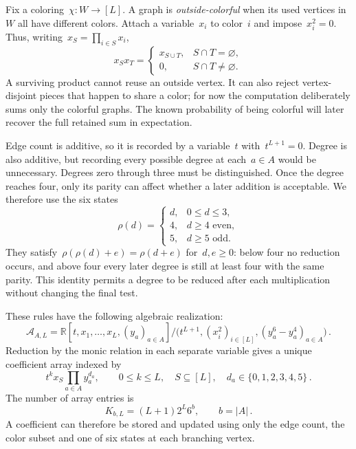 \documentclass[10pt]{article}
\theoremstyle{plain}
\theoremstyle{definition}
\theoremstyle{remark}
\begin{document}
Fix a coloring~$\chi:W\to[L]$. A graph is \emph{outside-colorful} when its used vertices in~$W$ all have different colors. Attach a variable~$x_i$ to color~$i$ and impose~$x_i^2=0$. Thus, writing~$x_S=\prod_{i\in S}x_i$,
\begin{equation}\label{eq:sk-color-product}
 x_Sx_T=\begin{cases}x_{S\cup T},&S\cap T=\varnothing,\\0,&S\cap T\ne\varnothing.\end{cases}
\end{equation}
A surviving product cannot reuse an outside vertex. It can also reject vertex-disjoint pieces that happen to share a color; for now the computation deliberately sums only the colorful graphs. The known probability of being colorful will later recover the full retained sum in expectation.

Edge count is additive, so it is recorded by a variable~$t$ with~$t^{L+1}=0$. Degree is also additive, but recording every possible degree at each~$a\in A$ would be unnecessary. Degrees zero through three must be distinguished. Once the degree reaches four, only its parity can affect whether a later addition is acceptable. We therefore use the six states
\begin{equation}\label{eq:sk-degree-state}
 \rho(d)=\begin{cases}d,&0\le d\le3,\\4,&d\ge4\text{ even},\\5,&d\ge5\text{ odd}.\end{cases}
\end{equation}
They satisfy~$\rho(\rho(d)+e)=\rho(d+e)$ for~$d,e\ge0$: below four no reduction occurs, and above four every later degree is still at least four with the same parity. This identity permits a degree to be reduced after each multiplication without changing the final test.

These rules have the following algebraic realization:
\begin{equation}\label{eq:sk-algebra}
 \mathcal A_{A,L}=\mathbb R[t,x_1,\ldots,x_L,(y_a)_{a\in A}]
 /\bigl(t^{L+1},(x_i^2)_{i\in[L]},(y_a^6-y_a^4)_{a\in A}\bigr)\,.
\end{equation}
Reduction by the monic relation in each separate variable gives a unique coefficient array indexed by
\begin{equation}\label{eq:sk-basis}
 t^kx_S\prod_{a\in A}y_a^{d_a},\qquad 0\le k\le L,\quad S\subseteq[L],\quad d_a\in\{0,1,2,3,4,5\}\,.
\end{equation}
The number of array entries is
\begin{equation}\label{eq:sk-dimension}
 K_{b,L}=(L+1)2^L6^b,\qquad b=|A|\,.
\end{equation}
A coefficient can therefore be stored and updated using only the edge count, the color subset and one of six states at each branching vertex.
\end{document}
